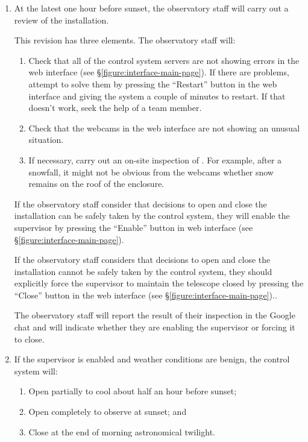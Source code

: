 \begin{enumerate}

\item At the latest one hour before sunset, the observatory staff will carry out a review of the {\projectname} installation. 

This revision has three elements. The observatory staff will:

\begin{enumerate}
\item
Check that all of the control system servers are not showing errors in the web interface (see \S\ref{figure:interface-main-page}). If there are problems, attempt to solve them by pressing the “Restart” button in the web interface and giving the system a couple of minutes to restart. If that doesn't work, seek the help of a team member.
\item
Check that the webcams in the web interface are not showing an unusual situation.
\item
If necessary, carry out an on-site inspection of {\projectname}. For example, after a snowfall, it might not be obvious from the webcams whether snow remains on the roof of the enclosure.
\end{enumerate}

If the observatory staff consider that decisions to open and close the installation can be safely taken by the control system, they will enable the supervisor by pressing the “Enable” button in web interface (see \S\ref{figure:interface-main-page}). 

If the observatory staff considers that decisions to open and close the installation cannot be safely taken by the control system, they should explicitly force the supervisor to maintain the telescope closed by pressing the “Close” button in  the web interface (see \S\ref{figure:interface-main-page}).. 

The observatory staff will report the result of their inspection in the Google chat and will indicate whether they are enabling the supervisor or forcing it to close.

\item
If the supervisor is enabled and weather conditions are benign, the control system will:
\begin{enumerate}
\item
Open partially to cool about half an hour before sunset;
\item
Open completely to observe at sunset; and
\item
Close at the end of morning astronomical twilight.
\end{enumerate}


\end{enumerate}
